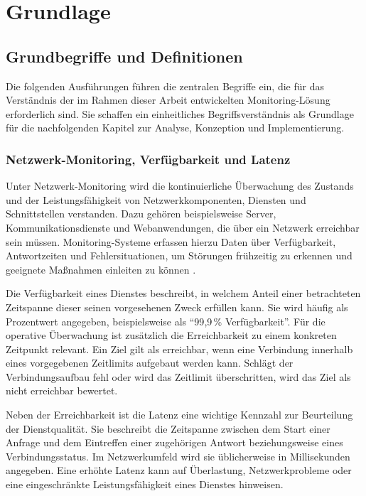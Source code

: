 \chapter{Grundlage}

\section{Grundbegriffe und Definitionen}

Die folgenden Ausführungen führen die zentralen Begriffe ein, die für das Verständnis der im Rahmen dieser Arbeit entwickelten Monitoring-Lösung erforderlich sind. Sie schaffen ein einheitliches Begriffsverständnis als Grundlage für die nachfolgenden Kapitel zur Analyse, Konzeption und Implementierung.

\subsection{Netzwerk-Monitoring, Verfügbarkeit und Latenz}

Unter Netzwerk-Monitoring wird die kontinuierliche Überwachung des Zustands und der Leistungsfähigkeit von Netzwerkkomponenten, Diensten und Schnittstellen verstanden. Dazu gehören beispielsweise Server, Kommunikationsdienste und Webanwendungen, die über ein Netzwerk erreichbar sein müssen. Monitoring-Systeme erfassen hierzu Daten über Verfügbarkeit, Antwortzeiten und Fehlersituationen, um Störungen frühzeitig zu erkennen und geeignete Maßnahmen einleiten zu können \cite{monitoring:prometheus}.

Die Verfügbarkeit eines Dienstes beschreibt, in welchem Anteil einer betrachteten Zeitspanne dieser seinen vorgesehenen Zweck erfüllen kann. Sie wird häufig als Prozentwert angegeben, beispielsweise als \enquote{99{,}9\,\% Verfügbarkeit}. Für die operative Überwachung ist zusätzlich die Erreichbarkeit zu einem konkreten Zeitpunkt relevant. Ein Ziel gilt als erreichbar, wenn eine Verbindung innerhalb eines vorgegebenen Zeitlimits aufgebaut werden kann. Schlägt der Verbindungsaufbau fehl oder wird das Zeitlimit überschritten, wird das Ziel als nicht erreichbar bewertet.

Neben der Erreichbarkeit ist die Latenz eine wichtige Kennzahl zur Beurteilung der Dienstqualität. Sie beschreibt die Zeitspanne zwischen dem Start einer Anfrage und dem Eintreffen einer zugehörigen Antwort beziehungsweise eines Verbindungsstatus. Im Netzwerkumfeld wird sie üblicherweise in Millisekunden angegeben. Eine erhöhte Latenz kann auf Überlastung, Netzwerkprobleme oder eine eingeschränkte Leistungsfähigkeit eines Dienstes hinweisen.

